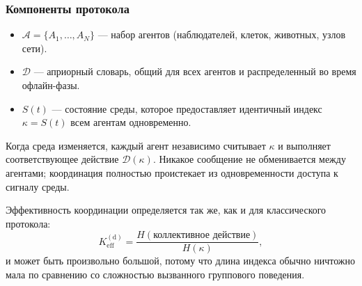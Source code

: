 \documentclass[11pt,a4paper]{article}
\begin{document}
	\subsubsection*{Компоненты протокола}
	\begin{itemize}[leftmargin=*]
		\item $\mathcal{A} = \{A_1,\dots,A_N\}$ — набор агентов (наблюдателей, клеток, животных, узлов сети).
		\item $\mathcal{D}$ — априорный словарь, общий для всех агентов и распределенный во время офлайн-фазы.
		\item $S(t)$ — состояние среды, которое предоставляет идентичный индекс $\kappa = S(t)$ всем агентам
		одновременно.
	\end{itemize}
	Когда среда изменяется, каждый агент независимо считывает $\kappa$ и выполняет соответствующее действие
	$\mathcal{D}(\kappa)$. Никакое сообщение не обменивается между агентами; координация полностью проистекает из
	одновременности доступа к сигналу среды.
	
	Эффективность координации определяется так же, как и для классического протокола:
	\[
	K_{\mathrm{eff}}^{\mathrm{(d)}} = \frac{H(\text{коллективное действие})}{H(\kappa)},
	\]
	и может быть произвольно большой, потому что длина индекса обычно ничтожно мала по сравнению со сложностью
	вызванного группового поведения.
	
\end{document}
